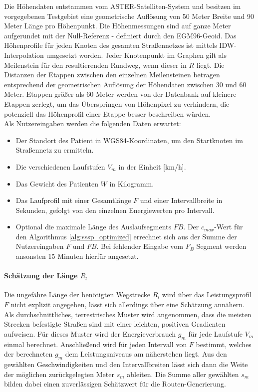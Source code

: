 \documentclass[12pt]{article}
\begin{document}
Die Höhendaten entstammen vom ASTER-Satelliten-System und besitzen im vorgegebenen Testgebiet eine geometrische Auflösung von 50 Meter Breite und 90 Meter Länge pro Höhenpunkt. Die Höhenmessungen sind auf ganze Meter aufgerundet mit der Null-Referenz - definiert durch den EGM96-Geoid. Das Höhenprofile für jeden Knoten des gesamten Straßennetzes ist mittels IDW-Interpolation \citep{shepard1968} umgesetzt worden. Jeder Knotenpunkt im Graphen gilt als Meilenstein für den resultierenden Rundweg, wenn dieser in $R$ liegt. Die Distanzen der Etappen zwischen den einzelnen Meilensteinen betragen entsprechend der geometrischen Auflösung der Höhendaten zwischen 30 und 60 Meter. Etappen größer als 60 Meter werden von der Datenbank auf kleinere Etappen zerlegt, um das Überspringen von Höhenpixel zu verhindern, die potenziell das Höhenprofil einer Etappe besser beschreiben würden.\\ 
Als Nutzereingaben werden die folgenden Daten erwartet:
\begin{itemize}
\item Der Standort des Patient in WGS84-Koordinaten, um den Startknoten im Straßennetz zu ermitteln.
\item Die verschiedenen Laufstufen $V_{m}$ in der Einheit [km/h].
\item Das Gewicht des Patienten $W$ in Kilogramm.
\item Das Laufprofil mit einer Gesamtlänge $F$ und einer Intervallbreite in Sekunden, gefolgt von den einzelnen Energiewerten pro Intervall.
\item Optional die maximale Länge des Auslaufsegments $F{B}$.
Der $c_{max}$-Wert für den Algorithmus \ref{alg:sssp_optimized} errechnet sich aus der Summe der Nutzereingaben $F$ und $F{B}$. Bei fehlender Eingabe vom $F_B$ Segment werden ansonsten 15 Minuten hierfür angesetzt.
\end{itemize}

\paragraph{Schätzung der Länge $R_{l}$}
Die ungefähre Länge der benötigten Wegstrecke $R_{l}$ wird über das Leistungsprofil $F$ nicht explizit angegeben, lässt sich allerdings über eine Schätzung annähern. Als durchschnittliches, terrestrisches Muster wird angenommen, dass die meisten Strecken befestigte Straßen sind mit einer leichten, positiven Gradienten aufweisen. Für dieses Muster wird der Energieverbrauch $g_{m}$ für jede Laufstufe $V_{m}$ einmal berechnet. Anschließend wird für jeden Intervall von $F$ bestimmt, welches der berechneten $g_{m}$ dem Leistungsniveaus am näherstehen liegt. Aus den gewählten Geschwindigkeiten und den Intervallbreiten lässt sich dann die Weite der möglichen zurückgelegten Meter $s_{m}$ ableiten. Die Summe aller gewählten $s_{m}$ bilden dabei einen zuverlässigen Schätzwert für die Routen-Generierung.\\
\end{document}
